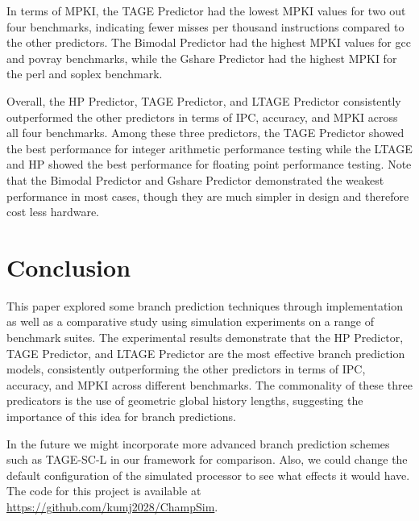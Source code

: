 \documentclass[conference]{IEEEtran}
\begin{document}
In terms of MPKI, the TAGE Predictor had the lowest MPKI values for two out four benchmarks, indicating fewer misses per thousand instructions compared to the other predictors. The Bimodal Predictor had the highest MPKI values for gcc and povray benchmarks, while the Gshare Predictor had the highest MPKI for the perl and soplex benchmark.

Overall, the HP Predictor, TAGE Predictor, and LTAGE Predictor consistently outperformed the other predictors in terms of IPC, accuracy, and MPKI across all four benchmarks. Among these three predictors, the TAGE Predictor showed the best performance for integer arithmetic performance testing while the LTAGE and HP showed the best performance for floating point performance testing. Note that the Bimodal Predictor and Gshare Predictor demonstrated the weakest performance in most cases, though they are much simpler in design and therefore cost less hardware.

\section{Conclusion} \label{sec:conclusion}
This paper explored some branch prediction techniques through implementation as well as a comparative study using simulation experiments on a range of benchmark suites. The experimental results demonstrate that the HP Predictor, TAGE Predictor, and LTAGE Predictor are the most effective branch prediction models, consistently outperforming the other predictors in terms of IPC, accuracy, and MPKI across different benchmarks. The commonality of these three predicators is the use of geometric global history lengths, suggesting the importance of this idea for branch predictions.

In the future we might incorporate more advanced branch prediction schemes such as TAGE-SC-L in our framework for comparison. Also, we could change the default configuration of the simulated processor to see what effects it would have. The code for this project is available at \url{https://github.com/kumj2028/ChampSim}.




\vspace{12pt}
\end{document}
